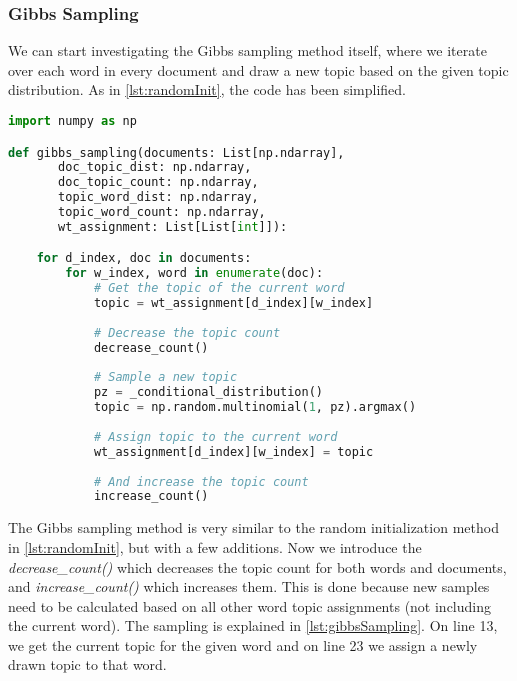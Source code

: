 \subsubsection{Gibbs Sampling}
We can start investigating the Gibbs sampling method itself, where we iterate over each word in every document and draw a new topic based on the given topic distribution.
As in \autoref{lst:randomInit}, the code has been simplified.
\begin{lstlisting}[language=Python, caption=Gibbs Sampling Method,label={lst:gibbsSampling}, float, floatplacement=H]
import numpy as np

def gibbs_sampling(documents: List[np.ndarray],
	   doc_topic_dist: np.ndarray,
	   doc_topic_count: np.ndarray,
	   topic_word_dist: np.ndarray,
	   topic_word_count: np.ndarray,
	   wt_assignment: List[List[int]]):

	for d_index, doc in documents:
		for w_index, word in enumerate(doc):
			# Get the topic of the current word
			topic = wt_assignment[d_index][w_index]
			
			# Decrease the topic count
			decrease_count()
			
			# Sample a new topic
			pz = _conditional_distribution()
			topic = np.random.multinomial(1, pz).argmax()
			
			# Assign topic to the current word
			wt_assignment[d_index][w_index] = topic
			
			# And increase the topic count
			increase_count()
\end{lstlisting}
The Gibbs sampling method is very similar to the random initialization method in \autoref{lst:randomInit}, but with a few additions. 
Now we introduce the \emph{decrease\_count()} which decreases the topic count for both words and documents, and  \emph{increase\_count()} which increases them.
This is done because new samples need to be calculated based on all other word topic assignments (not including the current word).
The sampling is explained in \autoref{lst:gibbsSampling}.
On line 13, we get the current topic for the given word and on line 23 we assign a newly drawn topic to that word.

